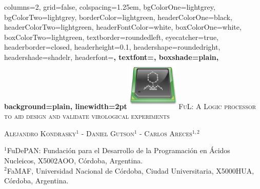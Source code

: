 \documentclass[portrait,final,a0paper,fontscale=0.277]{baposter}
\begin{document}
\begin{poster}%
  {
  columns=2,
  grid=false,
  colspacing=1.25em,
  bgColorOne=lightgrey,
  bgColorTwo=lightgrey,
  borderColor=lightgreen,
  headerColorOne=black,
  headerColorTwo=lightgreen,
  headerFontColor=white,
  boxColorOne=white,
  boxColorTwo=lightgreen,
  textborder=roundedleft,
  eyecatcher=true,
  headerborder=closed,
  headerheight=0.1\textheight,
  headershape=roundedright,
  headershade=shadelr,
  headerfont=\Large\bf\textsc, %
  textfont={\setlength{\parindent}{1.5em}},
  boxshade=plain,
  background=plain,
  linewidth=2pt
  }
  {
  	\includegraphics[height=6.5em]{ful_logo}
  }
  {
  \LARGE
  \textsc{FuL: A Logic processor to aid design and validate virological experiments}\vspace{0.5em}
  }
  {
  	\textsc{Alejandro Kondrasky$^{1}$ - Daniel Gutson$^{1}$ - Carlos Areces$^{1,2}$}
    \footnotesize{
    \begin{flushleft}
	\hspace{1.5em}$^1$FuDePAN: Fundación para el Desarrollo de la Programación en Ácidos Nucleicos, X5002AOO, Córdoba, Argentina.\\
    \hspace{1.5em}$^2$FaMAF, Universidad Nacional de Córdoba, Ciudad Universitaria, X5000HUA, Córdoba, Argentina.\\
	\end{flushleft}
    }
  }		
  {%
	\begin{minipage}{12em}

\end{minipage}}
\end{poster}
\end{document}
